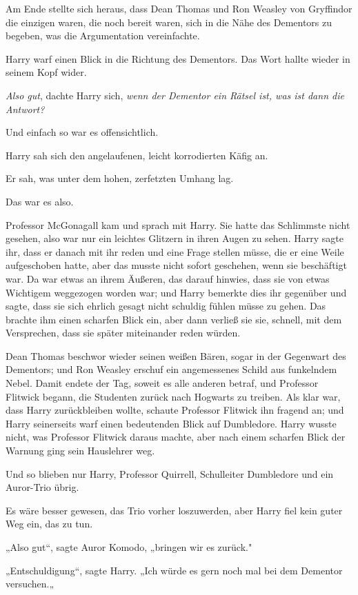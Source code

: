 {Am Ende stellte sich heraus, dass Dean Thomas und Ron Weasley von Gryffindor die einzigen waren, die noch bereit waren, sich in die Nähe des Dementors zu begeben, was die Argumentation vereinfachte.

Harry warf einen Blick in die Richtung des Dementors. Das Wort hallte wieder in seinem Kopf wider.

\emph{Also gut}, dachte Harry sich, \emph{wenn der Dementor ein Rätsel ist, was ist dann die Antwort?}

Und einfach so war es offensichtlich.

Harry sah sich den angelaufenen, leicht korrodierten Käfig an.

Er sah, was unter dem hohen, zerfetzten Umhang lag.

Das war es also.

Professor McGonagall kam und sprach mit Harry. Sie hatte das Schlimmste nicht gesehen, also war nur ein leichtes Glitzern in ihren Augen zu sehen. Harry sagte ihr, dass er danach mit ihr reden und eine Frage stellen müsse, die er eine Weile aufgeschoben hatte, aber das musste nicht sofort geschehen, wenn sie beschäftigt war. Da war etwas an ihrem Äußeren, das darauf hinwies, dass sie von etwas Wichtigem weggezogen worden war; und Harry bemerkte dies ihr gegenüber und sagte, dass sie sich ehrlich gesagt nicht schuldig fühlen müsse zu gehen. Das brachte ihm einen scharfen Blick ein, aber dann verließ sie sie, schnell, mit dem Versprechen, dass sie später miteinander reden würden.

Dean Thomas beschwor wieder seinen weißen Bären, sogar in der Gegenwart des Dementors; und Ron Weasley erschuf ein angemessenes Schild aus funkelndem Nebel. Damit endete der Tag, soweit es alle anderen betraf, und Professor Flitwick begann, die Studenten zurück nach Hogwarts zu treiben. Als klar war, dass Harry zurückbleiben wollte, schaute Professor Flitwick ihn fragend an; und Harry seinerseits warf einen bedeutenden Blick auf Dumbledore. Harry wusste nicht, was Professor Flitwick daraus machte, aber nach einem scharfen Blick der Warnung ging sein Hauslehrer weg.

Und so blieben nur Harry, Professor Quirrell, Schulleiter Dumbledore und ein Auror-Trio übrig.

Es wäre besser gewesen, das Trio vorher loszuwerden, aber Harry fiel kein guter Weg ein, das zu tun.

„Also gut“, sagte Auror Komodo, „bringen wir es zurück."

„Entschuldigung“, sagte Harry. „Ich würde es gern noch mal bei dem Dementor versuchen.„

}

